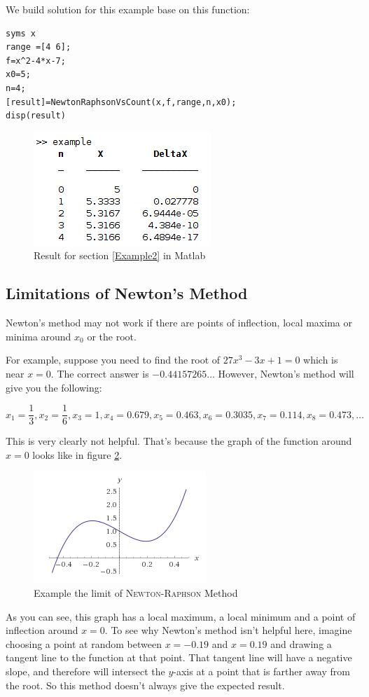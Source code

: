 We build solution for this example base on this function:
\begin{lstlisting}
syms x
range =[4 6];
f=x^2-4*x-7;
x0=5;
n=4;
[result]=NewtonRaphsonVsCount(x,f,range,n,x0);
disp(result)
\end{lstlisting}

\begin{figure}[H]
    \centering
    \includegraphics{Figures/Chapter2/resultNewton.png}
    \caption{Result for section \ref{Example2} in Matlab}
    \label{fig:Piecewise}
\end{figure}

\subsection{Limitations of Newton's Method}


Newton's method may not work if there are points of inflection, local maxima or minima around $x_0$  or the root.

For example, suppose you need to find the root of $27x^3 - 3x + 1 = 0$ which is near $x = 0$.
The correct answer is $-0.44157265\ldots$ However, Newton's method will give you the following:

\begin{equation*}
     x_{1}=\frac{1}{3}, x_{2}=\frac{1}{6}, x_{3}=1, x_{4}=0.679, x_{5}=0.463, x_{6}=0.3035, x_{7}=0.114, x_{8}=0.473, \ldots 
\end{equation*}

This is very clearly not helpful. That's because the graph of the function around $x = 0$ looks like in figure \ref{fig:limitNewton}.
\begin{figure}[H]
    \centering
    \includegraphics{Figures/Chapter2/limitNewton.png}
    \caption{Example the limit of \textsc{Newton-Raphson} Method }
    \label{fig:limitNewton}
\end{figure}
As you can see, this graph has a local maximum, a local minimum and a point of inflection around $x = 0$. To see why Newton's method isn't helpful here, imagine choosing a point at random between $x = -0.19$ and $x=0.19$ and drawing a tangent line to the function at that point. That tangent line will have a negative slope, and therefore will intersect the $y$-axis at a point that is farther away from the root. So this method doesn't always give the expected result.
